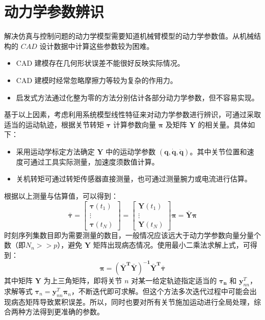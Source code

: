 \documentclass[cn,11pt,chinese,blue,bibstyle=ieeetr]{elegantbook}
\begin{document}
\section{动力学参数辨识}

解决仿真与控制问题的动力学模型需要知道机械臂模型的动力学参数值。从机械结构的 $CAD$ 设计数据中计算这些参数较为困难。
\begin{itemize}
\item CAD 建模存在几何形状误差不能很好反映实际情况。
\item CAD 建模时经常忽略摩擦力等较为复杂的作用力。
\item 启发式方法通过化整为零的方法分别估计各部分动力学参数，但不容易实现。
\end{itemize}

基于以上因素，考虑利用系统模型线性特征来对动力学参数进行辨识，可通过采取适当的运动轨迹，根据关节转矩 $\bm{\tau}$ 计算参数向量 $\bm{\pi}$ 及矩阵 $\bm Y$ 的相关量。具体如下：
\begin{itemize}
	\item 采用运动学标定方法确定 $\bm{Y}$ 中的运动学参数 $(\bm{q, \dot{q}, \ddot{q}})$。其中关节位置和速度可通过工具实际测量，加速度须数值计算。
	\item 关机转矩可通过转矩传感器直接测量，也可通过测量腕力或电流进行估算。
\end{itemize}

根据以上测量与估算值，可以得到：
\begin{equation}
\bm{\bar{\tau}} = 
\begin{bmatrix}
\bm \tau(t_1) \\
\vdots \\
\bm \tau(t_N)
\end{bmatrix} =
\begin{bmatrix}
\bm Y (t_1) \\
\vdots \\
\bm Y (t_N)
\end{bmatrix} \bm{\pi} = \bm{\bar{Y} \pi}
\end{equation}
时刻序列集数目即为需要测量的数目，一般情况应该远大于动力学参数向量分量个数（即$N_n >> p$），避免 $\bm{Y}$ 矩阵出现病态情况。使用最小二乘法求解上式，可得到：
\begin{equation}
\bm{\pi = (\bar{Y}^T\bar{Y})^{-1}\bar{Y}^T\bar{\tau}}
\end{equation}
其中矩阵 $\bm{Y}$ 为上三角矩阵，即将关节 $n$ 对某一给定轨迹指定适当的 $\bm{\tau_n}$ 和 $\bm{y}_{nn}^T$，求解等式 $\bm{\tau}_n = \bm{y}_{nn}^T\bm{\pi}_n$，不断迭代即可求解。但这个方法多次迭代过程中可能会出现病态矩阵导致累积误差。所以，同时也要对所有关节施加运动进行全局处理，综合两种方法得到更准确的参数。
\end{document}

